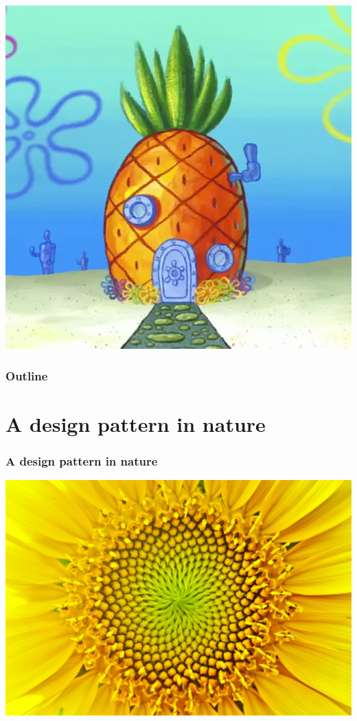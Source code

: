 \documentclass[12pt,compress,english,utf8,t]{beamer}
\begin{document}
{\begin{center}
    \includegraphics[height=0.25\textheight]{spongebob-ananas}
  \end{center}
}

\begin{frame}\frametitle{Outline}\tableofcontents\end{frame}



\section{A design pattern in nature}

\begin{frame}\frametitle{A design pattern in nature}
  \begin{center}
    \includegraphics[height=0.8\textheight]{sonnenblume2}

  \end{center}
\end{frame}
\end{document}
